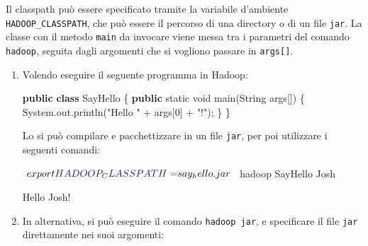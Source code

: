 \documentclass[italian,a4paper, twoside, 12pt]{report}
\newenvironment{Shaded}{}{}
\newcommand{\KeywordTok}[1]{\textcolor[rgb]{0.00,0.44,0.13}{\textbf{#1}}}
\newcommand{\DataTypeTok}[1]{\textcolor[rgb]{0.56,0.13,0.00}{#1}}
\newcommand{\DecValTok}[1]{\textcolor[rgb]{0.25,0.63,0.44}{#1}}
\newcommand{\StringTok}[1]{\textcolor[rgb]{0.25,0.44,0.63}{#1}}
\newcommand{\FunctionTok}[1]{\textcolor[rgb]{0.02,0.16,0.49}{#1}}
\newcommand{\VariableTok}[1]{\textcolor[rgb]{0.10,0.09,0.49}{#1}}
\newcommand{\BuiltInTok}[1]{#1}
\newcommand{\ExtensionTok}[1]{#1}
\newcommand{\NormalTok}[1]{#1}
\begin{document}
Il classpath può essere specificato tramite la variabile d'ambiente
\texttt{HADOOP\_CLASSPATH}, che può essere il percorso di una directory
o di un file \texttt{jar}. La classe con il metodo \texttt{main} da
invocare viene messa tra i parametri del comando \texttt{hadoop},
seguita dagli argomenti che si vogliono passare in \texttt{args{[}{]}}.

\begin{enumerate}
\def\labelenumi{(\arabic{enumi})}
\item
  Volendo eseguire il seguente programma in Hadoop:

\begin{Shaded}
\begin{Highlighting}[]
\KeywordTok{public} \KeywordTok{class}\NormalTok{ SayHello \{}
    \KeywordTok{public} \DataTypeTok{static} \DataTypeTok{void} \FunctionTok{main}\NormalTok{(}\BuiltInTok{String}\NormalTok{ args[]) \{}
        \BuiltInTok{System}\NormalTok{.}\FunctionTok{out}\NormalTok{.}\FunctionTok{println}\NormalTok{(}\StringTok{"Hello "}\NormalTok{ + args[}\DecValTok{0}\NormalTok{] + }\StringTok{"!"}\NormalTok{);}
\NormalTok{    \}}
\NormalTok{\}}
\end{Highlighting}
\end{Shaded}

  Lo si può compilare e pacchettizzare in un file \texttt{jar}, per poi
  utilizzare i seguenti comandi:

\begin{Shaded}
\begin{Highlighting}[]

\NormalTok{$}\ExtensionTok{~} \BuiltInTok{export} \VariableTok{HADOOP_CLASSPATH=}\NormalTok{say_hello.jar }
\NormalTok{$}\ExtensionTok{~} \ExtensionTok{hadoop}\NormalTok{ SayHello Josh}

\ExtensionTok{Hello}\NormalTok{ Josh!}
\end{Highlighting}
\end{Shaded}
\item
  In alternativa, si può eseguire il comando \texttt{hadoop\ jar}, e
  specificare il file \texttt{jar} direttamente nei suoi argomenti:

\begin{Shaded}
\end{Shaded}
\end{enumerate}
\end{document}
